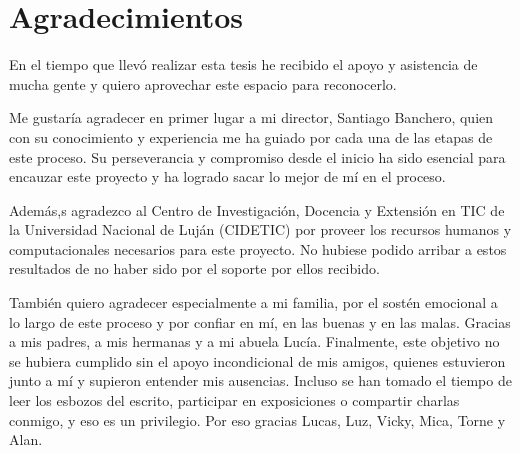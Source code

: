 \chapter*{Agradecimientos}

\noindent En el tiempo que llevó realizar esta tesis he recibido el apoyo y
asistencia de mucha gente y quiero aprovechar este espacio para reconocerlo.

Me gustaría agradecer en primer lugar a mi director, Santiago Banchero, quien
con su conocimiento y experiencia me ha guiado por cada una de las etapas de este
proceso. Su perseverancia y compromiso desde el inicio ha sido esencial para
encauzar este proyecto y ha logrado sacar lo mejor de mí en el proceso.

Además,s agradezco al Centro de Investigación, Docencia y Extensión en TIC de la
Universidad Nacional de Luján (CIDETIC) por proveer los recursos humanos y
computacionales necesarios para este proyecto. No hubiese podido arribar a estos
resultados de no haber sido por el soporte por ellos recibido.

También quiero agradecer especialmente a mi familia, por el sostén emocional a
lo largo de este proceso y por confiar en mí, en las buenas y en las malas.
Gracias a mis padres, a mis hermanas y a mi abuela Lucía.  Finalmente, este
objetivo no se hubiera cumplido sin el apoyo incondicional de mis amigos,
quienes estuvieron junto a mí y supieron entender mis ausencias. Incluso se han
tomado el tiempo de leer los esbozos del escrito, participar en exposiciones o
compartir charlas conmigo, y eso es un privilegio. Por eso gracias Lucas, Luz,
Vicky, Mica, Torne y Alan.
